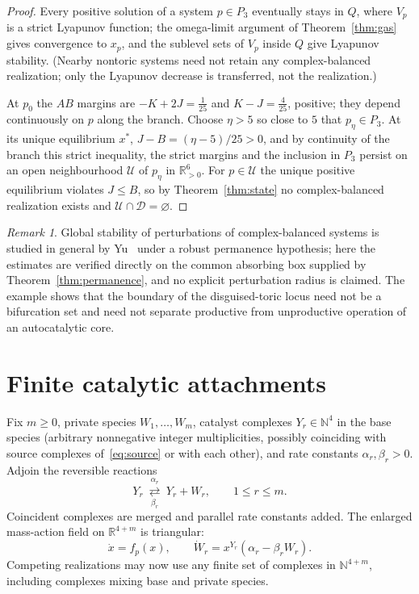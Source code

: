 \documentclass[11pt,a4paper]{article}
\theoremstyle{plain}
\theoremstyle{definition}
\theoremstyle{remark}
\newtheorem{remark}[theorem]{Remark}
\newcommand{\R}{\mathbb{R}}
\newcommand{\N}{\mathbb{N}}
\newcommand{\Rp}{\R_{>0}}
\newcommand{\DT}{\mathcal{D}}
\newcommand{\xs}{x^{*}}
\newcommand{\rev}[2]{\mathrel{\mathop{\rightleftarrows}\limits^{#1}_{#2}}}
\begin{document}
\begin{proof}
Every positive solution of a system $p\in P_3$ eventually stays in $Q$, where $V_p$ is a strict Lyapunov function; the omega-limit argument of Theorem~\ref{thm:gas} gives convergence to $x_p$, and the sublevel sets of $V_p$ inside $Q$ give Lyapunov stability. (Nearby nontoric systems need not retain any complex-balanced realization; only the Lyapunov decrease is transferred, not the realization.)

At $p_0$ the $AB$ margins are $-K+2J=\tfrac1{25}$ and $K-J=\tfrac4{25}$, positive; they depend continuously on $p$ along the branch. Choose $\eta>5$ so close to $5$ that $p_\eta\in P_3$. At its unique equilibrium $\xs$, $J-B=(\eta-5)/25>0$, and by continuity of the branch this strict inequality, the strict margins and the inclusion in $P_3$ persist on an open neighbourhood $\mathcal U$ of $p_\eta$ in $\Rp^6$. For $p\in\mathcal U$ the unique positive equilibrium violates $J\le B$, so by Theorem~\ref{thm:state} no complex-balanced realization exists and $\mathcal U\cap\DT=\varnothing$.
\end{proof}

\begin{remark}
Global stability of perturbations of complex-balanced systems is studied in general by Yu~\cite{Yu2022} under a robust permanence hypothesis; here the estimates are verified directly on the common absorbing box supplied by Theorem~\ref{thm:permanence}, and no explicit perturbation radius is claimed. The example shows that the boundary of the disguised-toric locus need not be a bifurcation set and need not separate productive from unproductive operation of an autocatalytic core.
\end{remark}

\section{Finite catalytic attachments}\label{sec:assembly}

Fix $m\ge0$, private species $W_1,\dots,W_m$, catalyst complexes $Y_r\in\N^4$ in the base species (arbitrary nonnegative integer multiplicities, possibly coinciding with source complexes of~\eqref{eq:source} or with each other), and rate constants $\alpha_r,\beta_r>0$. Adjoin the reversible reactions
\begin{equation}\label{eq:attach}
Y_r\ \rev{\alpha_r}{\beta_r}\ Y_r+W_r,\qquad 1\le r\le m .
\end{equation}
Coincident complexes are merged and parallel rate constants added. The enlarged mass-action field on $\R^{4+m}$ is triangular:
\begin{equation}\label{eq:triangular}
\dot x=f_p(x),\qquad \dot W_r=x^{Y_r}(\alpha_r-\beta_rW_r).
\end{equation}
Competing realizations may now use any finite set of complexes in $\N^{4+m}$, including complexes mixing base and private species.
\end{document}
